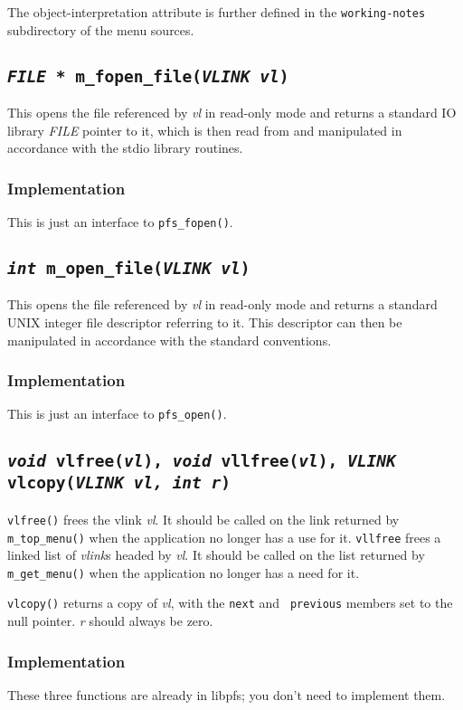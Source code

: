 The {\sc object-interpretation} attribute is further defined in the
{\tt working-notes} subdirectory of the menu sources.

\subsection{\tt {\it FILE *} m\_fopen\_file({\it VLINK vl})}

This opens the file referenced by {\it vl} in read-only mode and
returns a standard IO library {\it FILE} pointer to it, which is then
read from and manipulated in accordance with the stdio library
routines.

\subsubsection{Implementation}

This is just an interface to {\tt pfs\_fopen()}.

\subsection{\tt {\it int} m\_open\_file({\it VLINK vl})}

This opens the file referenced by {\it vl} in read-only mode and
returns a standard UNIX integer file descriptor referring to it.  This
descriptor can then be manipulated in accordance with the standard
conventions.  

\subsubsection{Implementation}

This is just an interface to {\tt pfs\_open()}.

\subsection{\tt {\it void} vlfree({\it vl}), {\it void} vllfree({\it vl}), 
	{\it VLINK} vlcopy({\it VLINK vl, int r})}

{\tt vlfree()} frees the vlink {\it vl}.  It should be called on the
link returned by {\tt m\_top\_menu()} when the application no
longer has a use for it.  {\tt vllfree} frees a linked list of {\it
vlink}s headed by {\it vl}.  It should be called on the list returned
by {\tt m\_get\_menu()} when the application no longer has a need for
it.

{\tt vlcopy()} returns a copy of {\it vl}, with the {\tt next} and {\tt
previous} members set to the null pointer.  {\it r} should always be zero.

\subsubsection{Implementation}

These three functions are already in libpfs; you don't need to implement them.


